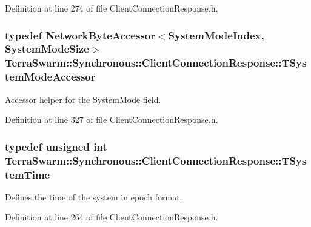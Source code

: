 Definition at line 274 of file Client\-Connection\-Response.\-h.

\hypertarget{class_terra_swarm_1_1_synchronous_1_1_client_connection_response_a241ee2024d2b124e89185884213650c2}{
\subsubsection[{T\-System\-Mode\-Accessor}]{\setlength{\rightskip}{0pt plus 5cm}typedef {\bf Network\-Byte\-Accessor}$<${\bf System\-Mode\-Index}, {\bf System\-Mode\-Size}$>$ {\bf Terra\-Swarm\-::\-Synchronous\-::\-Client\-Connection\-Response\-::\-T\-System\-Mode\-Accessor}\hspace{0.3cm}{\ttfamily [private]}}}\label{class_terra_swarm_1_1_synchronous_1_1_client_connection_response_a241ee2024d2b124e89185884213650c2}


Accessor helper for the System\-Mode field. 



Definition at line 327 of file Client\-Connection\-Response.\-h.

\hypertarget{class_terra_swarm_1_1_synchronous_1_1_client_connection_response_a7b389f7e89631ce7c758c3a26c46c303}{
\subsubsection[{T\-System\-Time}]{\setlength{\rightskip}{0pt plus 5cm}typedef unsigned int {\bf Terra\-Swarm\-::\-Synchronous\-::\-Client\-Connection\-Response\-::\-T\-System\-Time}}}\label{class_terra_swarm_1_1_synchronous_1_1_client_connection_response_a7b389f7e89631ce7c758c3a26c46c303}


Defines the time of the system in epoch format. 



Definition at line 264 of file Client\-Connection\-Response.\-h.

